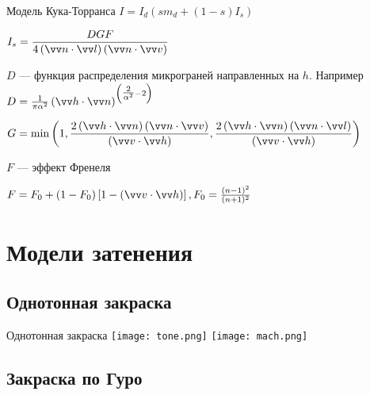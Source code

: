\documentclass[10pt]{beamer}
\begin{document}
 \begin{frame}{Модель Кука-Торранса}
 	$I=I_d\left(sm_d+(1-s)I_s\right)$
 	
 	$I_s=\dfrac{DGF}{4\left(\VV n \cdot \VV l\right)\left(\VV n \cdot \VV v\right)}$
 	
 	$D$ --- функция распределения микрограней направленных на $h$.
 	Например $D=\frac{1}{\pi\alpha^2}\left(\VV h \cdot \VV n\right)^{\left(\tfrac{2}{\alpha^2} - 2\right)}$
 	
 	$G=\min\left(1,\dfrac{2\left(\VV h \cdot \VV n\right)\left(\VV n \cdot \VV v\right)}{\left(\VV v \cdot \VV h\right)}, \dfrac{2\left(\VV h \cdot \VV n \right)\left(\VV n \cdot \VV l\right)}{\left(\VV v \cdot \VV h\right)}\right)$
 	
 	$F$ --- эффект Френеля
 	
 	$F=F_0+\left(1-F_0\right)\left[1-\left(\VV v \cdot \VV h\right)\right], F_0=\frac{(n-1)^2}{(n+1)^2}$
 	
 	
 	
 	
 \end{frame}
 
 \section{Модели затенения}
 
 \subsection{Однотонная закраска}
 
 \begin{frame}{Однотонная закраска}
 	{\texttt{[image: tone.png]}
 	}{\texttt{[image: mach.png]}
 	}
 \end{frame}
 
  \subsection{Закраска по Гуро}
  
\end{document}
